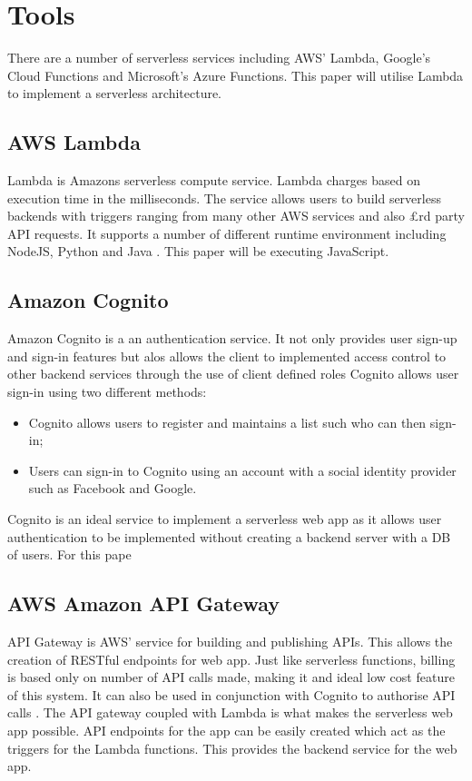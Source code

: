 \section{Tools}
  There are a number of serverless services including  AWS' Lambda, Google's Cloud Functions and Microsoft's Azure Functions. This paper will utilise Lambda to implement a serverless architecture.

  \subsection{AWS Lambda}
  Lambda is Amazons serverless compute service. Lambda charges based on execution time in the milliseconds. The service allows users to build serverless backends with triggers ranging from many other AWS services and also £rd party API requests. It supports a number of different runtime environment including NodeJS, Python and Java \citep{awsLambda}. This paper will be executing JavaScript.
  
  
  \subsection{Amazon Cognito}
  Amazon Cognito is a an authentication service. It not only provides user sign-up and sign-in features but alos allows the client to implemented access control to other backend services through the use of client defined roles \cite{awsCognito} Cognito allows user sign-in using two different methods:
  \begin{itemize}
    \item Cognito allows users to register and maintains a list such who can then sign-in;
    \item Users can sign-in to Cognito using an account with a social identity provider such as Facebook and Google.
  \end{itemize}
  Cognito is an ideal service to implement a serverless web app as it allows user authentication to be implemented without creating a backend server with a DB of users. For this pape
  
  
  \subsection{AWS Amazon API Gateway}
  API Gateway is AWS' service for building and publishing APIs. This allows the creation of RESTful endpoints for web app. Just like serverless functions, billing is based only on number of API calls made, making it and ideal low cost feature of this system. It can also be used in conjunction with Cognito to authorise API calls \citep{awsApiGateway}. The API gateway coupled with Lambda is what makes the serverless web app possible. API endpoints for the app can be easily created which act as the triggers for the Lambda functions. This provides the backend service for the web app.
  
